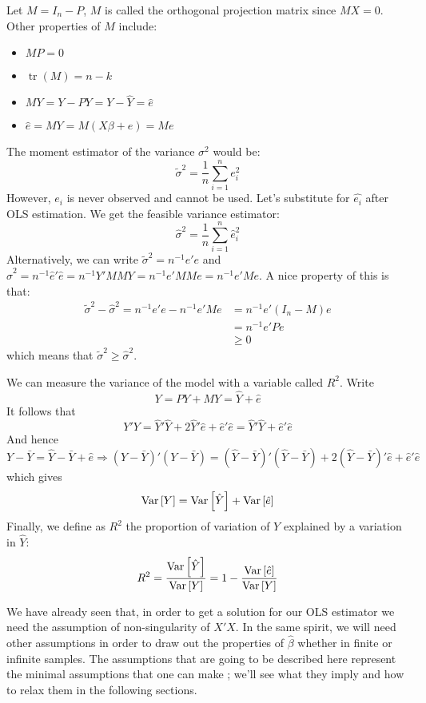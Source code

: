 \begin{definition}
Let $M = I_n - P$, $M$ is called the orthogonal projection matrix since $MX = 0$. Other properties of $M$ include:\begin{itemize}
\item $MP = 0$
\item $\operatorname{tr}(M) = n-k$
\item $MY = Y - PY = Y - \hat Y = \hat e $
\item $\hat e = MY = M(X\beta + e) = Me$
\end{itemize}
\end{definition}

\begin{definition}
The moment estimator of the variance $\sigma^2$ would be: $$\tilde{\sigma}^2 = \frac{1}{n}\sum_{i=1}^n e_i^2 $$ However, $e_i$ is never observed and cannot be used. Let's substitute for $\hat{e_i}$ after OLS estimation. We get the feasible variance estimator:$$\hat{\sigma}^2 = \frac{1}{n} \sum_{i=1}^n \hat e_i^2 $$ Alternatively, we can write $\tilde{\sigma}^2 = n^{-1}e'e$ and $\hat{\sigma}^2 = n^{-1}\hat{e}'\hat{e} = n^{-1}Y'MMY = n^{-1}e'MMe = n^{-1}e'Me$. A nice property of this is that:\begin{align*}
\tilde{\sigma}^2 - \hat{\sigma}^2 = n^{-1}e'e - n^{-1}e'Me & = n^{-1}e'(I_n - M)e \\
& = n^{-1}e'Pe \\
& \geq 0
\end{align*}which means that $\tilde{\sigma}^2 \geq \hat{\sigma}^2$.
\end{definition}

\begin{definition}
We can measure the variance of the model with a variable called $R^2$. Write $$Y = PY + MY = \hat{Y} + \hat{e}$$ It follows that $$Y'Y = \hat{Y}'\hat{Y} + 2\hat{Y}'\hat{e} + \hat{e}'\hat{e} = \hat{Y}'\hat{Y} + \hat{e}'\hat{e} $$
And hence $Y - \bar{Y} = \hat{Y} - \bar{Y} + \hat{e} \Rightarrow (Y - \bar{Y})'(Y - \bar{Y}) = (\hat{Y} - \bar{Y})'(\hat{Y} - \bar{Y}) + 2(\hat{Y} - \bar{Y})'\hat{e} + \hat{e}'\hat{e}$ which gives $$\operatorname{Var}\left[Y\right] = \operatorname{Var}\left[\hat{Y}\right] + \operatorname{Var}\left[\hat{e}\right]$$ Finally, we define as $R^2$ the proportion of variation of $Y$ explained by a variation in $\hat{Y}$: $$R^2 = \frac{\operatorname{Var}\left[\hat{Y}\right]}{\operatorname{Var}\left[Y\right]} = 1 - \frac{\operatorname{Var}\left[\hat{e}\right]}{\operatorname{Var}\left[Y\right]} $$
\end{definition}

We have already seen that, in order to get a solution for our OLS estimator we need the assumption of non-singularity of $X'X$. In the same spirit, we will need other assumptions in order to draw out the properties of $\hat\beta$ whether in finite or infinite samples. The assumptions that are going to be described here represent the minimal assumptions that one can make ; we'll see what they imply and how to relax them in the following sections.

